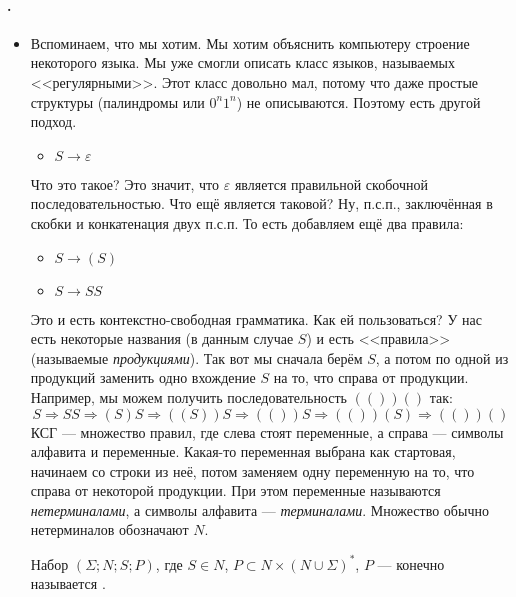 \documentclass{article}
\begin{document}
    \paragraph{.}
    \begin{itemize}
        \item[]
        \begin{Comment}
            Вспоминаем, что мы хотим. Мы хотим объяснить компьютеру строение некоторого языка. Мы уже смогли описать класс языков, называемых <<регулярными>>. Этот класс довольно мал, потому что даже простые структуры (палиндромы или $0^n1^n$) не описываются. Поэтому есть другой подход.
            \begin{itemize}
                \item $S\to\varepsilon$
            \end{itemize}
            Что это такое? Это значит, что $\varepsilon$ является правильной скобочной последовательностью. Что ещё является таковой? Ну, п.с.п., заключённая в скобки и конкатенация двух п.с.п. То есть добавляем ещё два правила:
            \begin{itemize}
                \item $S\to(S)$
                \item $S\to SS$
            \end{itemize}
            Это и есть контекстно-свободная грамматика. Как ей пользоваться? У нас есть некоторые названия (в данным случае $S$) и есть <<правила>> (называемые \textit{продукциями}). Так вот мы сначала берём $S$, а потом по одной из продукций заменить одно вхождение $S$ на то, что справа от продукции. Например, мы можем получить последовательность $(())()$ так:
            $$
            S\Rightarrow SS\Rightarrow(S)S\Rightarrow((S))S\Rightarrow(())S\Rightarrow(())(S)\Rightarrow(())()
            $$
            КСГ --- множество правил, где слева стоят переменные, а справа --- символы алфавита и переменные. Какая-то переменная выбрана как стартовая, начинаем со строки из неё, потом заменяем одну переменную на то, что справа от некоторой продукции. При этом переменные называются \textit{нетерминалами}, а символы алфавита --- \textit{терминалами}. Множество обычно нетерминалов обозначают $N$.
        \end{Comment}
        \dfn Набор $(\Sigma;N;S;P)$, где $S\in N$, $P\subset N\times(N\cup\Sigma)^*$, $P$ --- конечно называется .
        \begin{Comment}

\end{Comment}
\end{itemize}
\end{document}
